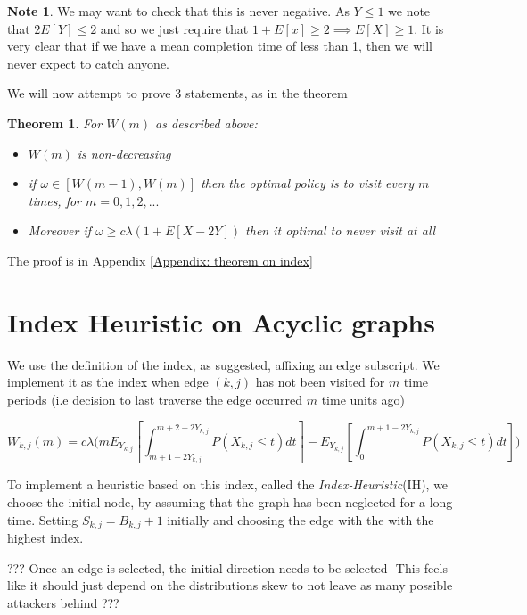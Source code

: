 \documentclass[a4paper,10pt]{article}
\newtheorem{theorem}{Theorem}[section]
\theoremstyle{definition}
\theoremstyle{definition}
\theoremstyle{remark}
\theoremstyle{definition}
\newtheorem*{note}{Note}
\begin{document}
\begin{note}
We may want to check that this is never negative. As $Y \leq 1$ we note that $2E[Y] \leq 2$ and so we just require that $1+E[x] \geq 2 \implies E[X] \geq 1$. It is very clear that if we have a mean completion time of less than 1, then we will never expect to catch anyone.
\end{note}

We will now attempt to prove 3 statements, as in the theorem

\begin{theorem}
\label{theorem: Index for Acylic graphs}
For $W(m)$ as described above:
\begin{itemize}
\item $W(m)$ is non-decreasing
\item if $\omega \in [W(m-1),W(m)]$ then the optimal policy is to visit every $m$ times, for $m=0,1,2,...$
\item Moreover if $\omega \geq c \lambda (1+E[X-2Y])$ then it optimal to never visit at all
\end{itemize}
\end{theorem}
The proof is in Appendix \ref{Appendix: theorem on index}

\section{Index Heuristic on Acyclic graphs}
We use the definition of the index, as suggested, affixing an edge subscript. We implement it as the index when edge $(k,j)$ has not been visited for $m$ time periods (i.e decision to last traverse the edge occurred $m$ time units ago)

\begin{equation}
W_{k,j}(m)=c \lambda \Bigg(mE_{Y_{k,j}} \left[\int_{m+1-2Y_{k,j}}^{m+2-2Y_{k,j}} P(X_{k,j} \leq t) dt \right] - E_{Y_{k,j}} \left[\int_{0}^{m+1-2Y_{k,j}} P(X_{k,j} \leq t) dt \right] \Bigg)
\end{equation}

To implement a heuristic based on this index, called the \textit{Index-Heuristic}(IH), we choose the initial node, by assuming that the graph has been neglected for a long time. Setting $S_{k,j}=B_{k,j}+1$ initially and choosing the edge with the with the highest index.

??? Once an edge is selected, the initial direction needs to be selected- This feels like it should just depend on the distributions skew to not leave as many possible attackers behind ???
\end{document}
